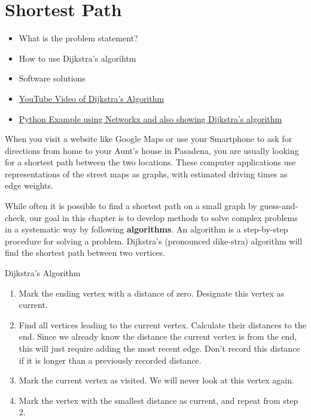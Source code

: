 \section{Shortest Path}
\begin{outcome}
\begin{itemize}
\item What is the problem statement?
\item How to use Dijkstra's algorihtm
\item Software solutions
\end{itemize}
\end{outcome}
\begin{resource}
\begin{itemize}
\item \href{https://youtu.be/EFg3u_E6eHU}{YouTube Video of Dijkstra's Algorithm}
\item \href{https://github.com/open-optimization/open-optimization-or-book/blob/master/instructive-code/networkx%20example%20-%20Dijkstra's%20Algorithm.ipynb}{Python Example using Networkx and also showing Dijkstra's algorithm}
\end{itemize}
\end{resource}
When you visit a website like Google Maps or use your Smartphone to ask for directions from home to your Aunt's house in Pasadena, you are usually looking for a shortest path between the two locations.  These computer applications use representations of the street maps as graphs, with estimated driving times as edge weights.

While often it is possible to find a shortest path on a small graph by guess-and-check, our goal in this chapter is to develop methods to solve complex problems in a systematic way by following \textbf{algorithms}.  An algorithm is a step-by-step procedure for solving a problem.  Dijkstra's (pronounced dike-stra) algorithm will find the shortest path between two vertices.


\begin{algorithm}{Dijkstra's Algorithm}{}
\hspace{3in}

\begin{enumerate}
\item	Mark the ending vertex with a distance of zero.  Designate this vertex as current.
\item Find all vertices leading to the current vertex.  Calculate their distances to the end.  Since we already know the distance the current vertex is from the end, this will just require adding the most recent edge.  Don't record this distance if it is longer than a previously recorded distance.
\item	Mark the current vertex as visited.  We will never look at this vertex again.
\item	Mark the vertex with the smallest distance as current, and repeat from step 2.
\end{enumerate}
 \end{algorithm}


